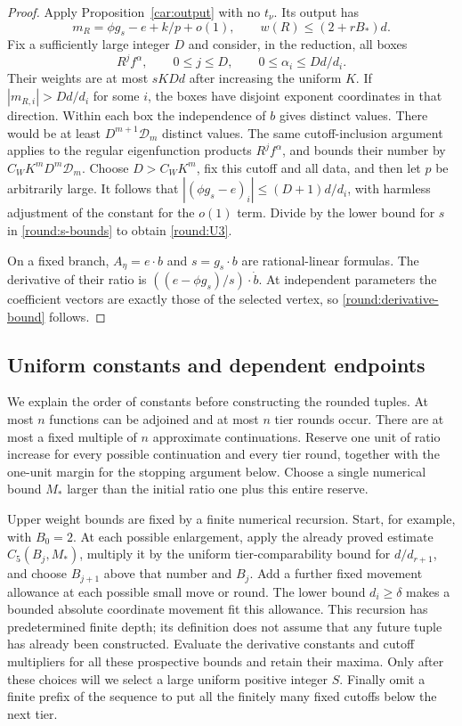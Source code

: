 \begin{proof}
Apply Proposition~\ref{car:output} with no $t_\nu$. Its output
has
\[
 m_R=\phi g_s-e+k/p+o(1),\qquad
 w(R)\le(2+rB_*)d.
\]
Fix a sufficiently large integer $D$ and consider, in the
reduction, all boxes
\[
 R^jf^\alpha,\qquad 0\le j\le D,\qquad
 0\le\alpha_i\le Dd/d_i.
\]
Their weights are at most $sKDd$ after increasing the uniform
$K$. If $|m_{R,i}|>Dd/d_i$ for some $i$, the boxes have disjoint
exponent coordinates in that direction. Within each box the
independence of $b$ gives distinct values. There would be at
least $D^{m+1}\mathcal D_m$ distinct values. The same
cutoff-inclusion argument applies to the regular eigenfunction
products $R^jf^\alpha$, and bounds their number by
$C_WK^mD^m\mathcal D_m$. Choose $D>C_WK^m$,
fix this cutoff and all data, and then let $p$ be arbitrarily
large. It follows that
$|(\phi g_s-e)_i|\le(D+1)d/d_i$, with harmless adjustment of
the constant for the $o(1)$ term. Divide by the lower bound
for $s$ in \eqref{round:s-bounds} to obtain \eqref{round:U3}.

On a fixed branch, $A_\eta=e\cdot b$ and $s=g_s\cdot b$ are
rational-linear formulas. The derivative of their ratio is
$((e-\phi g_s)/s)\cdot\dot b$. At independent parameters the
coefficient vectors are exactly those of the selected vertex,
so \eqref{round:derivative-bound} follows.
\end{proof}

\subsection{Uniform constants and dependent endpoints}

We explain the order of constants before constructing the rounded
tuples. At most $n$ functions can be adjoined and at most $n$
tier rounds occur. There are at most a fixed multiple of $n$
approximate continuations. Reserve one unit of ratio increase
for every possible continuation and every tier round, together
with the one-unit margin for the stopping argument below.
Choose a single numerical bound $M_*$ larger than the initial
ratio one plus this entire reserve.

Upper weight bounds are fixed by a finite numerical recursion.
Start, for example, with $B_0=2$. At each possible enlargement,
apply the already proved estimate $C_5(B_j,M_*)$, multiply it
by the uniform tier-comparability bound for $d/d_{r+1}$, and
choose $B_{j+1}$ above that number and $B_j$. Add a further
fixed movement allowance at each possible small move or round.
The lower bound $d_i\ge\delta$ makes a bounded absolute
coordinate movement fit this allowance. This recursion has
predetermined finite depth; its definition does not assume
that any future tuple has already been constructed. Evaluate
the derivative constants and cutoff multipliers for all these
prospective bounds and retain their maxima. Only after these
choices will we select a large uniform positive integer $S$.
Finally omit a finite prefix of the sequence to put all the
finitely many fixed cutoffs below the next tier.

